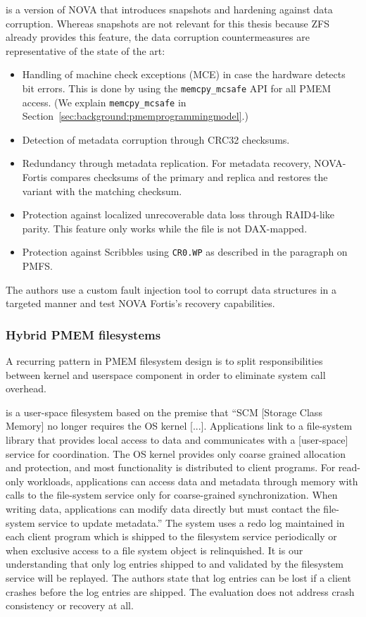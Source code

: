 \documentclass[12pt,a4paper,twoside]{book}
\begin{document}
 is a version of NOVA that introduces snapshots and hardening against data corruption.
Whereas snapshots are not relevant for this thesis because ZFS already provides this feature, the data corruption countermeasures are representative of the state of the art:
\begin{itemize}[noitemsep,beginpenalty=100000,midpenalty=100000]
    \item Handling of machine check exceptions (MCE) in case the hardware detects bit errors.
          This is done by using the \lstinline{memcpy_mcsafe} API for all PMEM access.
          (We explain \lstinline{memcpy_mcsafe} in Section~\ref{sec:background:pmemprogrammingmodel}.)
    \item Detection of metadata corruption through CRC32 checksums.
    \item Redundancy through metadata replication. For metadata recovery, NOVA-Fortis compares checksums of the primary and replica and restores the variant with the matching checksum.
    \item Protection against localized unrecoverable data loss through RAID4-like parity.
          This feature only works while the file is not DAX-mapped.
    \item Protection against Scribbles using \lstinline{CR0.WP} as described in the paragraph on PMFS.
\end{itemize}
The authors use a custom fault injection tool to corrupt data structures in a targeted manner and test NOVA Fortis's recovery capabilities.

\subsubsection{Hybrid PMEM filesystems}\label{sec:hybrid_pmem_file_systems}
A recurring pattern in PMEM filesystem design is to split responsibilities between kernel and userspace component in order to eliminate system call overhead.

 is a user-space filesystem based on the premise that
“SCM [Storage Class Memory] no longer requires the OS kernel [...].
Applications link to a file-system library that provides local access to data and communicates with a [user-space] service for coordination.
The OS kernel provides only coarse grained allocation and protection, and most functionality is distributed to client programs.
For read-only workloads, applications can access data and metadata through memory with calls to the file-system service only for coarse-grained synchronization.
When writing data, applications can modify data directly but must contact the file-system service to update metadata.”
The system uses a redo log maintained in each client program which is shipped to the filesystem service periodically or when exclusive access to a file system object is relinquished.
It is our understanding that only log entries shipped to and validated by the filesystem service will be replayed.
The authors state that log entries can be lost if a client crashes before the log entries are shipped.
The evaluation does not address crash consistency or recovery at all.
\end{document}
